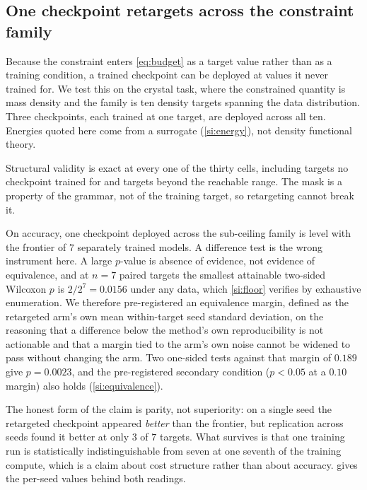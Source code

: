 \subsection{One checkpoint retargets across the constraint family}
\label{sec:retargeting}

Because the constraint enters \cref{eq:budget} as a target value rather than as a
training condition, a trained checkpoint can be deployed at values it never trained for.
We test this on the crystal task, where the constrained quantity is mass density and the
family is ten density targets spanning the data distribution. Three checkpoints, each
trained at one target, are deployed across all ten. Energies quoted here come from a
surrogate (\cref{si:energy}), not density functional theory.

Structural validity is exact at every one of the thirty cells, including targets no
checkpoint trained for and targets beyond the reachable range. The mask is a property of the
grammar, not of the training target, so retargeting cannot break it.

On accuracy, one checkpoint deployed across the sub-ceiling family is level with the
frontier of
$7$ separately trained models. A difference test is the wrong instrument here. A large
$p$-value is absence of evidence, not evidence of equivalence, and at $n = 7$ paired
targets the smallest attainable two-sided Wilcoxon $p$ is $2/2^7 = 0.0156$ under any
data, which \cref{si:floor} verifies by exhaustive enumeration. We therefore pre-registered an equivalence margin, defined as the retargeted
arm's own mean within-target seed standard deviation, on the reasoning that a difference
below the method's own reproducibility is not actionable and that a margin tied to the
arm's own noise cannot be widened to pass without changing the arm. Two one-sided tests
against that margin of $0.189$ give $p = 0.0023$, and the pre-registered secondary
condition ($p < 0.05$ at a $0.10$ margin) also holds (\cref{si:equivalence}).

The honest form of the claim is parity, not superiority: on a single seed the retargeted
checkpoint appeared \emph{better} than the frontier, but replication across seeds found
it better at only $3$ of $7$ targets. What survives is that one training run is
statistically indistinguishable from seven at one seventh of the training compute, which
is a claim about cost structure rather than about accuracy.  gives the
per-seed values behind both readings.

